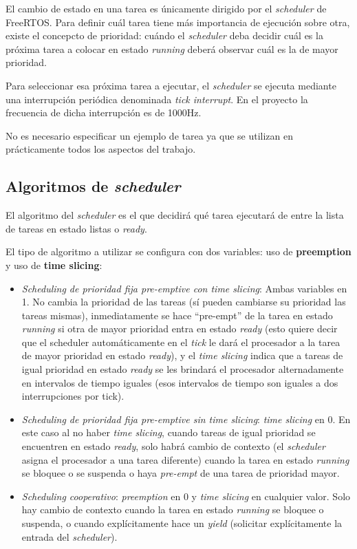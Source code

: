\documentclass{IEEEtran}
\begin{document}
El cambio de estado en una tarea es únicamente dirigido por el \textit{scheduler} de FreeRTOS. Para definir cuál tarea tiene más importancia de ejecución sobre otra, existe el concepcto de prioridad: cuándo el \textit{scheduler} deba decidir cuál es la próxima tarea a colocar en estado \textit{running} deberá observar cuál es la de mayor prioridad.

Para seleccionar esa próxima tarea a ejecutar, el \textit{scheduler} se ejecuta mediante una interrupción periódica denominada \textit{tick interrupt}. En el proyecto la frecuencia de dicha interrupción es de 1000Hz.

No es necesario especificar un ejemplo de tarea ya que se utilizan en prácticamente todos los aspectos del trabajo.

\subsection{Algoritmos de \textit{scheduler}}
El algoritmo del \textit{scheduler} es el que decidirá qué tarea ejecutará de entre la lista de tareas en estado listas o \textit{ready}.

El tipo de algoritmo a utilizar se configura con dos variables: uso de \textbf{preemption} y uso de \textbf{time slicing}:

\begin{itemize}
    \item \textit{Scheduling de prioridad fija pre-emptive con time slicing}: Ambas variables en 1. No cambia la prioridad de las tareas (sí pueden cambiarse su prioridad las tareas mismas), inmediatamente se hace ``pre-empt'' de la tarea en estado \textit{running} si otra de mayor prioridad entra en estado \textit{ready} (esto quiere decir que el scheduler automáticamente en el \textit{tick} le dará el procesador a la tarea de mayor prioridad en estado \textit{ready}), y el \textit{time slicing} indica que a tareas de igual prioridad en estado \textit{ready} se les brindará el procesador alternadamente en intervalos de tiempo iguales (esos intervalos de tiempo son iguales a dos interrupciones por tick).
    \item \textit{Scheduling de prioridad fija pre-emptive sin time slicing}: \textit{time slicing} en 0. En este caso al no haber \textit{time slicing}, cuando tareas de igual prioridad se encuentren en estado \textit{ready}, solo habrá cambio de contexto (el \textit{scheduler} asigna el procesador a una tarea diferente) cuando la tarea en estado \textit{running} se bloquee o se suspenda o haya \textit{pre-empt} de una tarea de prioridad mayor.
    \item \textit{Scheduling cooperativo}: \textit{preemption} en 0 y \textit{time slicing} en cualquier valor. Solo hay cambio de contexto cuando la tarea en estado \textit{running} se bloquee o suspenda, o cuando explícitamente hace un \textit{yield} (solicitar explícitamente la entrada del \textit{scheduler}).
\end{itemize}
\end{document}
